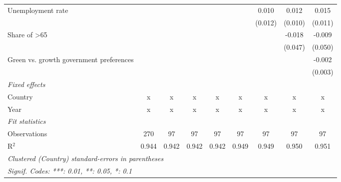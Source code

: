 \begin{table}[htbp]
\begin{tabular}{lcccccccc}
      Unemployment rate                            &         &              &         &         &              & 0.010        & 0.012         & 0.015\\   
                                                   &         &              &         &         &              & (0.012)      & (0.010)       & (0.011)\\   
      Share of >65                                 &         &              &         &         &              &              & -0.018        & -0.009\\   
                                                   &         &              &         &         &              &              & (0.047)       & (0.050)\\   
      Green vs. growth government preferences      &         &              &         &         &              &              &               & -0.002\\   
                                                   &         &              &         &         &              &              &               & (0.003)\\   
      \emph{Fixed effects}\\
      Country                                      & x       & x            & x       & x       & x            & x            & x             & x\\  
      Year                                         & x       & x            & x       & x       & x            & x            & x             & x\\  
      \midrule \emph{Fit statistics}\\
      Observations                                 & 270     & 97           & 97      & 97      & 97           & 97           & 97            & 97\\  
      R$^2$                                        & 0.944   & 0.942        & 0.942   & 0.942   & 0.949        & 0.949        & 0.950         & 0.951\\  
      \midrule
      \multicolumn{9}{l}{\emph{Clustered (Country) standard-errors in parentheses}}\\
      \multicolumn{9}{l}{\emph{Signif. Codes: ***: 0.01, **: 0.05, *: 0.1}}\\
   \end{tabular}
\end{table}


